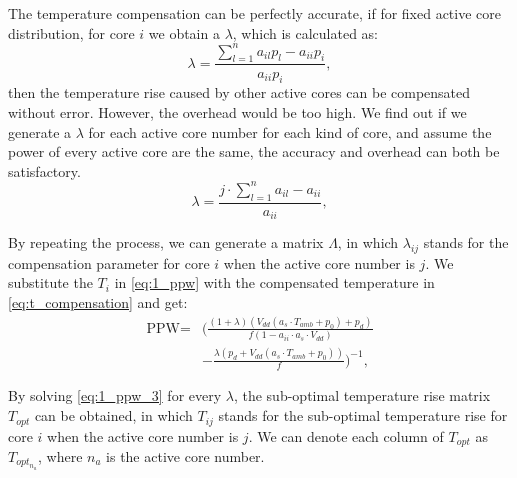 The temperature compensation can be perfectly accurate, if for fixed active core distribution, for core $i$ we obtain a $\lambda$, which is calculated as:
\begin{equation}\label{eq:lambda_accuracy}
\lambda =\frac{\sum_{l=1}^{n}a_{il}p_{l}-a_{ii}p_{i}}{a_{ii}p_{i}},
\end{equation}
then the temperature rise caused by other active cores can be compensated without error. However, the overhead would be too high. We find out if we generate a $\lambda$ for each active core number for each kind of core, and assume the power of every active core are the same, the accuracy and overhead can both be satisfactory.
\begin{equation}\label{eq:lambda}
\lambda =\frac{j \cdot \sum_{l=1}^{n}a_{il}-a_{ii}}{a_{ii}},
\end{equation}





By repeating the process, we can generate a matrix $\Lambda$, in which $\lambda_{ij}$ stands for the compensation parameter for core $i$ when the active core number is $j$. We substitute the $T_{i}$ in \eqref{eq:1_ppw} with the compensated temperature in \eqref{eq:t_compensation} and get:
\begin{equation}\label{eq:1_ppw_3}
\begin{split}
\text{PPW} =& (\frac{(1+\lambda)(V_{dd}(a_{s}\cdot T_{amb}+p_{0})+p_{d})}{f(1-a_{ii} \cdot a_{s} \cdot V_{dd})}\\
&-\frac{\lambda(p_{d}+V_{dd}(a_{s}\cdot T_{amb}+p_{0}))}{f})^{-1},
\end{split}
\end{equation}

By solving \eqref{eq:1_ppw_3} for every $\lambda$, the sub-optimal temperature rise matrix $T_{opt}$ can be obtained, in which $T_{ij}$ stands for the sub-optimal temperature rise for core $i$ when the active core number is $j$. We can denote each column of $T_{opt}$ as $T_{opt_{n_{a}}}$, where $n_{a}$ is the active core number. 


